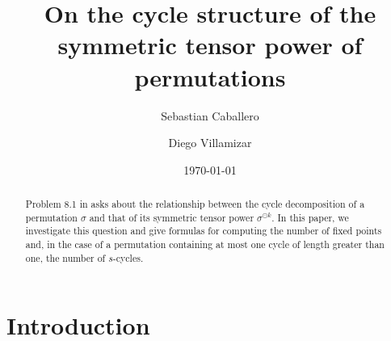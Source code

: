 \documentclass[12pt]{amsart}
\title{On the cycle structure of the symmetric tensor power of permutations}
\author{Sebastian Caballero}
\author{Diego Villamizar}
\date{\today}
\begin{document}
\begin{abstract}
Problem 8.1 in \cite{AstaizaetAl2026} asks about the relationship between the cycle decomposition of a permutation $\sigma$ and that of its symmetric tensor power $\sigma ^{\odot k}$. In this paper, we investigate this question and give formulas for computing the number of fixed points and, in the case of a permutation containing at most one cycle of length greater than one, the number of $s$-cycles.
\end{abstract}
\maketitle

\section{Introduction}
\noindent 
\end{document}
